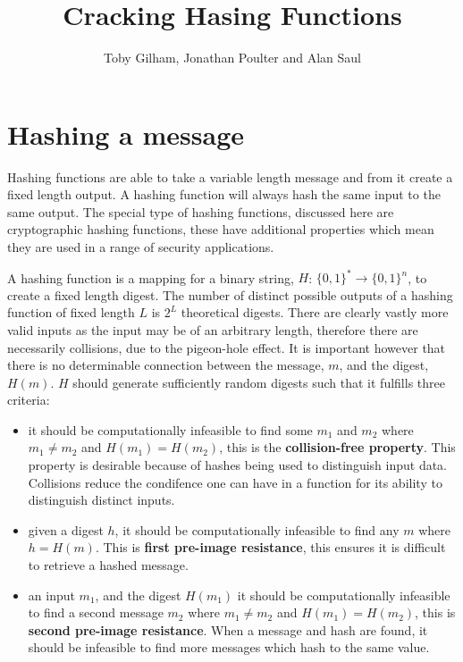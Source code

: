 \documentclass[a4paper,12pt]{article}
\title{Cracking Hasing Functions}
\author{Toby Gilham, Jonathan Poulter and Alan Saul}
\date{}
\begin{document}
\maketitle



\section{Hashing a message}
Hashing functions are able to take a variable length message and from it create a fixed length output. A hashing function will always hash the same input to the same output. The special type of hashing functions, discussed here are cryptographic hashing functions, these have additional properties which mean they are used in a range of security applications.

A hashing function is a mapping for a binary string, $H$: $\{0,1\}^* \rightarrow \{0,1\}^n$, to create a fixed length digest. The number of distinct possible outputs of a hashing function of fixed length $L$ is $2^L$ theoretical digests. There are clearly vastly more valid inputs as the input may be of an arbitrary length, therefore there are necessarily collisions, due to the pigeon-hole effect. It is important however that there is no determinable connection between the message, $m$, and the digest, $H(m)$. $H$ should generate sufficiently random digests such that it fulfills three criteria:
\begin{itemize}
  \item it should be computationally infeasible to find some $m_1$ and $m_2$ where $m_1 \neq m_2$ and $H(m_1) = H(m_2)$, this is the \textbf{collision-free property}. This property is desirable because of hashes being used to distinguish input data. Collisions reduce the condifence one can have in a function for its ability to distinguish distinct inputs.
  \item given a digest $h$, it should be computationally infeasible to find any $m$ where $h = H(m)$. This is \textbf{first pre-image resistance}, this ensures it is difficult to retrieve a hashed message.
  \item  an input $m_1$, and the digest $H(m_1)$ it should be computationally infeasible to find a second message $m_2$ where $m_1 \neq m_2$ and $H(m_1) = H(m_2)$, this is \textbf{second pre-image resistance}. When a message and hash are found, it should be infeasible to find more messages which hash to the same value.
\end{itemize}
\end{document}
